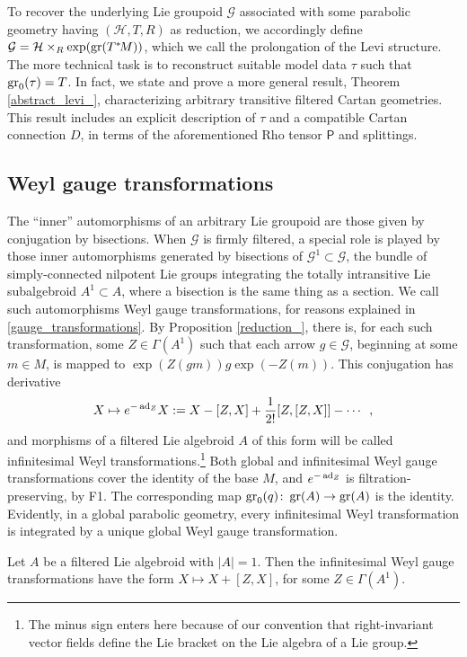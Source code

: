\documentclass[leqno,12pt]{amsart} %
\begin{document}
To recover the underlying Lie groupoid $\mathcal G$ associated with some parabolic
geometry having $({\mathcal H}, T, R)$ as reduction, we accordingly define
${\mathcal G} = {\mathcal H} \times_R \exp(\operatorname{\operatorname{gr}}(T^*\!M)) $, which we call the {\df
  prolongation} of the Levi structure. The more technical task is to reconstruct
suitable model data $\tau $ such that $\operatorname{\operatorname{gr}}_0(\tau) = T$. In fact, we state and prove a
more general result, Theorem \ref{abstract_levi_}, characterizing arbitrary transitive
filtered Cartan geometries. This result includes an explicit description of $\tau $
and a compatible Cartan connection $D$, in terms of the aforementioned Rho tensor
${\mathsf P}$ and splittings.

\subsection{Weyl gauge transformations}\label{gauge}
The ``inner'' automorphisms of an arbitrary Lie groupoid are those given by conjugation by
bisections. When ${\mathcal G} $ is firmly filtered, a special role is played by those
inner automorphisms generated by bisections of ${\mathcal G}^1 \subset {\mathcal G}$, the
bundle of simply-connected nilpotent Lie groups integrating the totally intransitive Lie
subalgebroid $A^1 \subset A$, where a bisection is the same thing as a section. We call
such automorphisms {\df Weyl gauge transformations}, for reasons explained in
\ref{gauge_transformations}. By Proposition \ref{reduction_}, there is, for each such
transformation, some $Z \in \Gamma(A^1)$ such that each arrow $g \in {\mathcal G} $,
beginning at some $m \in M$, is mapped to $\exp(Z(gm))g\exp(-Z(m))$. This conjugation has
derivative
$$X \mapsto e^{-\operatorname{ad}_Z}X:=X - [Z, X] + \frac{1}{2!}[Z, [Z, X]] - \cdots\enspace,$$
and morphisms of a filtered Lie algebroid $A$ of this form will be called {\df
  infinitesimal Weyl transformations}.\footnote{The minus sign enters here because of our
  convention that right-invariant vector fields define the Lie bracket on the Lie algebra
  of a Lie group.} Both global and infinitesimal Weyl gauge transformations cover the
identity of the base $M$, and $e^{-\operatorname{ad}_Z}$ is filtration-preserving, by F1. The
corresponding map $\operatorname{\operatorname{gr}}_0(q)\colon \operatorname{\operatorname{gr}}(A) \rightarrow \operatorname{\operatorname{gr}}(A)$ is the
identity. Evidently, in a global parabolic geometry, every infinitesimal Weyl
transformation is integrated by a unique global Weyl gauge transformation.

\begin{example}
  Let $A$ be a filtered Lie algebroid with $|A| = 1$. Then the infinitesimal Weyl gauge
  transformations have the form $X \mapsto X + [Z, X]$, for some $Z \in \Gamma(A^1)$.
\end{example}
\end{document}
